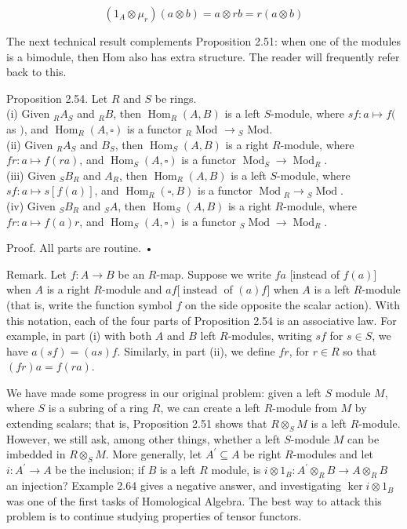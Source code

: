 \documentclass[10pt]{article}
\begin{document}
$$
\left(1_{A} \otimes \mu_{r}\right)(a \otimes b)=a \otimes r b=r(a \otimes b)
$$

The next technical result complements Proposition 2.51: when one of the modules is a bimodule, then Hom also has extra structure. The reader will frequently refer back to this.

Proposition 2.54. Let $R$ and $S$ be rings.\\
(i) Given ${ }_{R} A_{S}$ and ${ }_{R} B$, then $\operatorname{Hom}_{R}(A, B)$ is a left $S$-module, where $s f: a \mapsto f($ as $)$, and $\operatorname{Hom}_{R}(A, \square)$ is a functor ${ }_{R}$ Mod $\rightarrow{ }_{S}$ Mod.\\
(ii) Given ${ }_{R} A_{S}$ and $B_{S}$, then $\operatorname{Hom}_{S}(A, B)$ is a right $R$-module, where $f r: a \mapsto f(r a)$, and $\operatorname{Hom}_{S}(A, \square)$ is a functor $\operatorname{Mod}_{S} \rightarrow \operatorname{Mod}_{R}$.\\
(iii) Given ${ }_{S} B_{R}$ and $A_{R}$, then $\operatorname{Hom}_{R}(A, B)$ is a left $S$-module, where $s f: a \mapsto s[f(a)]$, and $\operatorname{Hom}_{R}(\square, B)$ is a functor $\operatorname{Mod}{ }_{R} \rightarrow{ }_{S} \operatorname{Mod}$.\\
(iv) Given ${ }_{S} B_{R}$ and ${ }_{S} A$, then $\operatorname{Hom}_{S}(A, B)$ is a right $R$-module, where $f r: a \mapsto f(a) r$, and $\operatorname{Hom}_{S}(A, \square)$ is a functor ${ }_{S} \operatorname{Mod} \rightarrow \operatorname{Mod}_{R}$.

Proof. All parts are routine. •

Remark. Let $f: A \rightarrow B$ be an $R$-map. Suppose we write $f a$ [instead of $f(a)]$ when $A$ is a right $R$-module and $a f[\operatorname{instead}$ of $(a) f]$ when $A$ is a left $R$-module (that is, write the function symbol $f$ on the side opposite the scalar action). With this notation, each of the four parts of Proposition 2.54 is an associative law. For example, in part (i) with both $A$ and $B$ left $R$-modules, writing $s f$ for $s \in S$, we have $a(s f)=(a s) f$. Similarly, in part (ii), we define $f r$, for $r \in R$ so that $(f r) a=f(r a)$.

We have made some progress in our original problem: given a left $S$ module $M$, where $S$ is a subring of a ring $R$, we can create a left $R$-module from $M$ by extending scalars; that is, Proposition 2.51 shows that $R \otimes_{S} M$ is a left $R$-module. However, we still ask, among other things, whether a left $S$-module $M$ can be imbedded in $R \otimes_{S} M$. More generally, let $A^{\prime} \subseteq A$ be right $R$-modules and let $i: A^{\prime} \rightarrow A$ be the inclusion; if $B$ is a left $R$ module, is $i \otimes 1_{B}: A^{\prime} \otimes_{R} B \rightarrow A \otimes_{R} B$ an injection? Example 2.64 gives a negative answer, and investigating $\operatorname{ker} i \otimes 1_{B}$ was one of the first tasks of Homological Algebra. The best way to attack this problem is to continue studying properties of tensor functors.
\end{document}
